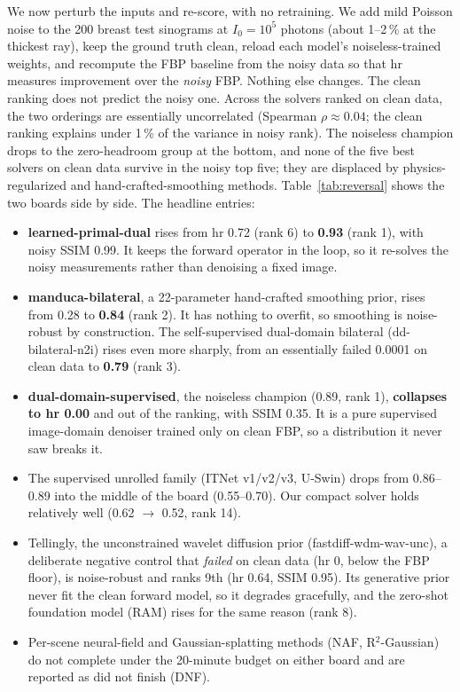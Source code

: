 \documentclass[AMA,twocolumn]{USG} %
\begin{document}
We now perturb the inputs and re-score, with no retraining. We add mild Poisson noise to the 200 breast test sinograms at $I_0=10^5$ photons (about 1--2\,\% at the thickest ray), keep the ground truth clean, reload each model's noiseless-trained weights, and recompute the FBP baseline from the noisy data so that hr measures improvement over the \emph{noisy} FBP. Nothing else changes. The clean ranking does not predict the noisy one. Across the solvers ranked on clean data, the two orderings are essentially uncorrelated (Spearman $\rho\approx0.04$; the clean ranking explains under 1\,\% of the variance in noisy rank). The noiseless champion drops to the zero-headroom group at the bottom, and none of the five best solvers on clean data survive in the noisy top five; they are displaced by physics-regularized and hand-crafted-smoothing methods. Table~\ref{tab:reversal} shows the two boards side by side. The headline entries:

\begin{itemize}
\item \textbf{learned-primal-dual}\cite{adler2018lpd} rises from hr 0.72 (rank 6) to \textbf{0.93} (rank 1), with noisy SSIM 0.99. It keeps the forward operator in the loop, so it re-solves the noisy measurements rather than denoising a fixed image.
\item \textbf{manduca-bilateral}, a 22-parameter hand-crafted smoothing prior,\cite{manduca2009bilateral} rises from 0.28 to \textbf{0.84} (rank 2). It has nothing to overfit, so smoothing is noise-robust by construction. The self-supervised dual-domain bilateral (dd-bilateral-n2i)\cite{hendriksen2020noise2inverse} rises even more sharply, from an essentially failed 0.0001 on clean data to \textbf{0.79} (rank 3).
\item \textbf{dual-domain-supervised}, the noiseless champion (0.89, rank 1),\cite{wagner2023dualdomain} \textbf{collapses to hr 0.00} and out of the ranking, with SSIM 0.35. It is a pure supervised image-domain denoiser trained only on clean FBP, so a distribution it never saw breaks it.
\item The supervised unrolled family (ITNet v1/v2/v3, U-Swin) drops from 0.86--0.89 into the middle of the board (0.55--0.70). Our compact solver holds relatively well (0.62 $\to$ 0.52, rank 14).
\item Tellingly, the unconstrained wavelet diffusion prior (fastdiff-wdm-wav-unc), a deliberate negative control that \emph{failed} on clean data (hr 0, below the FBP floor), is noise-robust and ranks 9th (hr 0.64, SSIM 0.95). Its generative prior never fit the clean forward model, so it degrades gracefully, and the zero-shot foundation model (RAM)\cite{terris2025ram} rises for the same reason (rank 8).
\item Per-scene neural-field and Gaussian-splatting methods (NAF, R$^2$-Gaussian)\cite{zha2022naf,zha2024r2gaussian} do not complete under the 20-minute budget on either board and are reported as did not finish (DNF).
\end{itemize}
\end{document}
